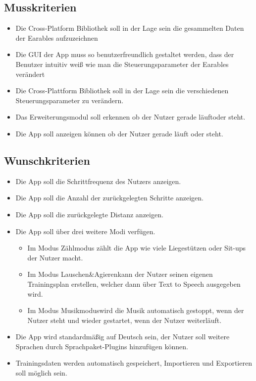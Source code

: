 \documentclass[a4paper,12pt]{article}
\begin{document}
\subsection{Musskriterien}

  \begin{itemize}
    \item\text Die Cross-Platform Bibliothek soll in der Lage sein die gesammelten Daten der \Gls{Earables} aufzuzeichnen
    \item\text Die GUI der App muss so benutzerfreundlich gestaltet werden, dass der Benutzer intuitiv weiß wie man die Steuerungsparameter der \Gls{Earables} verändert
    \item\text Die Cross-Plattform Bibliothek soll in der Lage sein die verschiedenen Steuerungsparameter zu verändern.
    \item\text Das Erweiterungsmodul soll erkennen ob der Nutzer gerade \glqq läuft\grqq{}oder \glqq steht\grqq.
    \item\text Die App soll anzeigen können ob der Nutzer gerade läuft oder steht.
  \end{itemize}
\subsection{Wunschkriterien}
  \begin{itemize}
    \item\text Die App soll die \Gls{Schrittfrequenz} des Nutzers anzeigen.
    \item\text Die App soll die Anzahl der zurückgelegten Schritte anzeigen. %
    \item\text Die App soll die zurückgelegte Distanz anzeigen. %
    \item\text Die App soll über drei weitere Modi verfügen.
      \begin{itemize}
        \item\text Im Modus \glqq Zählmodus\grqq{} zählt die App wie viele Liegestützen oder Sit-ups der Nutzer macht.
        \item\text  Im Modus \glqq Lauschen\&Agieren\grqq{}kann der Nutzer seinen eigenen Trainingsplan erstellen, welcher dann über Text to Speech ausgegeben wird.
        \item\text  Im Modus \glqq Musikmodus\grqq{}wird die Musik automatisch gestoppt, wenn der Nutzer steht und wieder gestartet, wenn der Nutzer weiterläuft.
      \end{itemize}
    \item\text Die App wird standardmäßig auf Deutsch sein, der Nutzer soll weitere Sprachen durch Sprachpaket-Plugins hinzufügen können.
    \item\text Trainingsdaten werden automatisch gespeichert, Importieren und Exportieren soll möglich sein. %
  \end{itemize}
\end{document}
